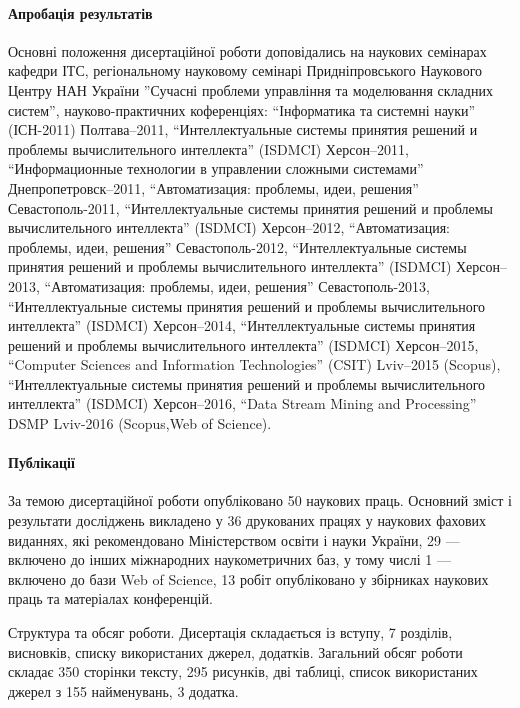 \paragraph{Апробація результатів}

Основні положення дисертаційної роботи доповідались на наукових
семінарах кафедри ІТС,
регіональному науковому семінарі Придніпровського Наукового Центру НАН України
''Сучасні проблеми управління та моделювання складних систем'',
науково-практичних коференціях:
``Інформатика та системні науки'' (ІСН-2011) Полтава--2011,
``Интеллектуальные системы принятия решений и проблемы вычислительного интеллекта'' (ISDMCI) Херсон--2011,
``Информационные технологии в управлении сложными системами'' Днепропетровск--2011,
``Автоматизация: проблемы, идеи, решения'' Севастополь-2011,
``Интеллектуальные системы принятия решений и проблемы вычислительного интеллекта'' (ISDMCI) Херсон--2012,
``Автоматизация: проблемы, идеи, решения'' Севастополь-2012,
``Интеллектуальные системы принятия решений и проблемы вычислительного интеллекта'' (ISDMCI) Херсон--2013,
``Автоматизация: проблемы, идеи, решения'' Севастополь-2013,
``Интеллектуальные системы принятия решений и проблемы вычислительного интеллекта'' (ISDMCI) Херсон--2014,
``Интеллектуальные системы принятия решений и проблемы вычислительного интеллекта'' (ISDMCI) Херсон--2015,
``Computer Sciences and Information Technologies'' (CSIT) Lviv--2015 (Scopus),
``Интеллектуальные системы принятия решений и проблемы вычислительного интеллекта'' (ISDMCI) Херсон--2016,
``Data Stream Mining and Processing'' DSMP Lviv-2016 (Scopus,Web of Science).

\paragraph{Публікації}

За темою дисертаційної роботи опубліковано
50 наукових праць. Основний зміст і результати досліджень
викладено у 36 друкованих працях у наукових фахових виданнях, які
рекомендовано Міністерством освіти і науки України,
29 --- включено до інших міжнародних наукометричних баз,
у тому числі 1 --- включено до бази Web of Science,
13 робіт опубліковано у збірниках наукових праць та матеріалах конференцій.

Структура та обсяг роботи. Дисертація складається із вступу, 7
розділів, висновків, списку використаних джерел, додатків.
Загальний обсяг
роботи складає 350 сторінки тексту, 295 рисунків, дві таблиці, список
використаних джерел з 155 найменувань, 3 додатка.

